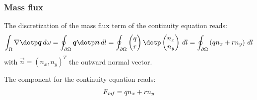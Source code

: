 \subsubsection{Mass flux}
The discretization of the mass flux term of the continuity equation reads:
\begin{align}
\int_\Omega \nabla \dotp \vec{q}\, d\omega =
\oint_{\partial\Omega} \vec{q} \dotp \vec{n} \, dl =
\oint_{\partial\Omega}
\begin{pmatrix}
    q \\
    r
\end{pmatrix}
\dotp
\begin{pmatrix}
    n_x \\
    n_y
\end{pmatrix}
    \, dl
=
\oint_{\partial\Omega} \left( q n_x + r n_y \right) \, dl
\end{align}
with $\vec{n} = (n_x, n_y)^T$ the outward normal vector.

The component for the continuity equation reads:
\begin{align}
    F_{{\it mf}} = q n_x + r n_y
\end{align}

